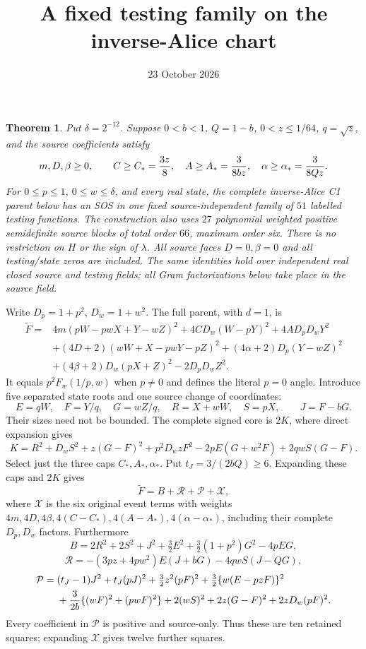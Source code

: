 \documentclass[11pt]{article}
\title{A fixed testing family on the inverse-Alice chart}
\author{}\date{23 October 2026}
\newtheorem{theorem}{Theorem}
\begin{document}
\maketitle

\begin{theorem}
Put $\delta=2^{-12}$. Suppose $0<b<1$, $Q=1-b$, $0<z\le1/64$,
$q=\sqrt z$, and the source coefficients satisfy
\[
 m,D,\beta\ge0,\qquad
 C\ge C_*={3z\over8},\quad
 A\ge A_*={3\over8bz},\quad
 \alpha\ge\alpha_*={3\over8Qz}.
\]
For $0\le p\le1$, $0\le w\le\delta$, and every real state,
the complete inverse-Alice C1 parent below has an SOS in one fixed
source-independent family of $51$ labelled testing functions.
The construction also uses $27$ polynomial weighted
positive semidefinite source blocks of total order $66$, maximum
order six. There is no restriction on $H$ or the sign of $\lambda$.
All source faces $D=0,\beta=0$ and all testing/state zeros are included.
The same identities hold over independent real closed source and testing
fields; all Gram factorizations below take place in the source field.
\end{theorem}

Write $D_p=1+p^2$, $D_w=1+w^2$. The full parent, with $d=1$, is
\[
\begin{split}
 \widetilde F={}&4m(pW-pwX+Y-wZ)^2+4CD_w(W-pY)^2
                  +4AD_pD_wY^2\\
 &+(4D+2)(wW+X-pwY-pZ)^2
 +(4\alpha+2)D_p(Y-wZ)^2\\
 &+(4\beta+2)D_w(pX+Z)^2-2D_pD_wZ^2.
\end{split}
\]
It equals $p^2F_w(1/p,w)$ when $p\ne0$ and defines the literal
$p=0$ angle. Introduce five separated state roots and one source
change of coordinates:
\[
 E=qW,\quad F=Y/q,\quad G=wZ/q,\quad
 R=X+wW,\quad S=pX,\qquad J=F-bG.
\]
Their sizes need not be bounded. The complete signed core is $2K$,
where direct expansion gives
\[
 K=R^2+D_wS^2+z(G-F)^2+p^2D_wzF^2
                          -2pE(G+w^2F)+2qwS(G-F).
\]
Select just the three caps $C_*,A_*,\alpha_*$. Put
$t_J=3/(2bQ)\ge6$. Expanding these caps and $2K$ gives
\[
 \widetilde F=B+\mathcal R+\mathcal P+\mathcal X,
\]
where $\mathcal X$ is the six original event terms with weights
$4m,4D,4\beta,4(C-C_*),4(A-A_*),4(\alpha-\alpha_*)$, including
their complete $D_p,D_w$ factors. Furthermore
\[
 B=2R^2+2S^2+J^2+\tfrac32E^2+\tfrac32(1+p^2)G^2-4pEG,
\]
\[
 \mathcal R=-(3pz+4pw^2)E(J+bG)-4qwS(J-QG),
\]
\[
\begin{split}
 \mathcal P={}&(t_J-1)J^2+t_J(pJ)^2
 +\tfrac32z^2(pF)^2+\tfrac32\{w(E-pzF)\}^2\\
 &+{3\over2b}\{(wF)^2+(pwF)^2\}
 +2(wS)^2+2z(G-F)^2+2zD_w(pF)^2.
\end{split}
\]
Every coefficient in $\mathcal P$ is positive and source-only.
Thus these are ten retained squares; expanding $\mathcal X$ gives
twelve further squares.
\end{document}
